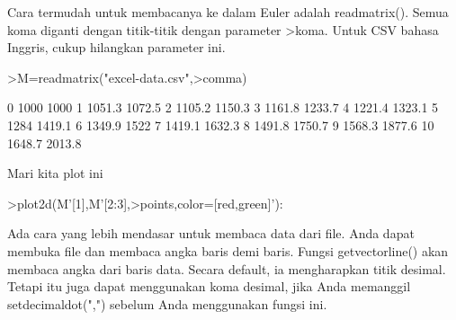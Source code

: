 \documentclass[a4paper,10pt]{article}
\begin{document}
\begin{eulernotebook}
\begin{eulercomment}
\begin{eulercomment}
\begin{eulercomment}
\begin{eulercomment}
\begin{eulercomment}
\begin{eulercomment}
\begin{eulercomment}
Cara termudah untuk membacanya ke dalam Euler adalah readmatrix().
Semua koma diganti dengan titik-titik dengan parameter \textgreater{}koma. Untuk
CSV bahasa Inggris, cukup hilangkan parameter ini.
\end{eulercomment}
\begin{eulerprompt}
>M=readmatrix("excel-data.csv",>comma)
\end{eulerprompt}
\begin{euleroutput}
          0      1000      1000 
          1    1051.3    1072.5 
          2    1105.2    1150.3 
          3    1161.8    1233.7 
          4    1221.4    1323.1 
          5      1284    1419.1 
          6    1349.9      1522 
          7    1419.1    1632.3 
          8    1491.8    1750.7 
          9    1568.3    1877.6 
         10    1648.7    2013.8 
\end{euleroutput}
\begin{eulercomment}
Mari kita plot ini
\end{eulercomment}
\begin{eulerprompt}
>plot2d(M'[1],M'[2:3],>points,color=[red,green]'):
\end{eulerprompt}
\begin{eulercomment}
Ada cara yang lebih mendasar untuk membaca data dari file. Anda dapat
membuka file dan membaca angka baris demi baris. Fungsi
getvectorline() akan membaca angka dari baris data. Secara default, ia
mengharapkan titik desimal. Tetapi itu juga dapat menggunakan koma
desimal, jika Anda memanggil setdecimaldot(",") sebelum Anda
menggunakan fungsi ini.


\end{eulercomment}
\end{eulercomment}
\end{eulercomment}
\end{eulercomment}
\end{eulercomment}
\end{eulercomment}
\end{eulercomment}
\end{eulernotebook}
\end{document}
